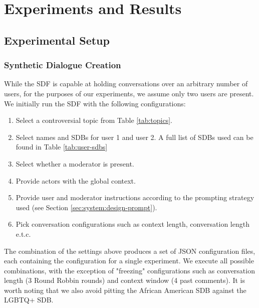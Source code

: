 %
\chapter{Experiments and Results}
\label{sec:evaluation}


\section{Experimental Setup}
\label{sec:evaluation:experimental}

\subsection{Synthetic Dialogue Creation}
\label{ssec:evaluation:experimental-dialogue}

While the SDF is capable at holding conversations over an arbitrary number of users, for the purposes of our experiments, we assume only two users are present. We initially run the SDF with the following configurations:

\begin{enumerate}
	\item Select a controversial topic from Table \ref{tab:topics}.
	
	\item Select names and SDBs for user 1 and user 2. A full list of SDBs used can be found in Table \ref{tab:user-sdbs}
	
	\item Select whether a moderator is present.
	
	\item Provide actors with the global context.
	
	\item Provide user and moderator instructions according to the prompting strategy used (see Section \ref{sec:system:design-prompt}).
	
	\item Pick conversation configurations such as context length, conversation length e.t.c.
\end{enumerate}

The combination of the settings above produces a set of JSON configuration files, each containing the configuration for a single experiment. We execute all possible combinations, with the exception of "freezing" configurations such as conversation length (3 Round Robbin rounds) and context window (4 past comments). It is worth noting that we also avoid pitting the African American SDB against the LGBTQ+ SDB.

